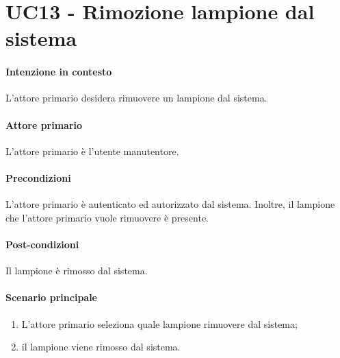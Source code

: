 \section{UC13 - Rimozione lampione dal sistema}\label{uc:13}


\paragraph{Intenzione in contesto}
L'attore primario desidera rimuovere un lampione dal sistema.
\paragraph{Attore primario}L'attore primario è l'utente manutentore.

\paragraph{Precondizioni} L'attore primario è autenticato ed autorizzato dal sistema. Inoltre, il lampione che l'attore primario vuole rimuovere è presente.

\paragraph{Post-condizioni} Il lampione è rimosso dal sistema.
\paragraph{Scenario principale}
\begin{enumerate}
    \item L'attore primario seleziona quale lampione rimuovere dal sistema;
    \item il lampione viene rimosso dal sistema.
\end{enumerate}